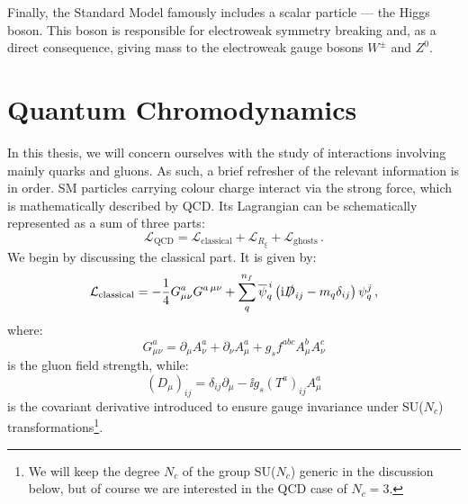 \documentclass[main.tex]{subfiles}
\begin{document}
Finally, the Standard Model famously includes a scalar particle --- the Higgs boson. This boson is responsible for electroweak symmetry breaking and, as a direct consequence, giving mass to the electroweak gauge bosons $W^\pm$ and $Z^0$. 
\section{Quantum Chromodynamics} \label{sec:QCD}
In this thesis, we will concern ourselves with the study of interactions involving mainly quarks and gluons. As such, a brief refresher of the relevant information is in order. SM particles carrying colour charge interact via the strong force, which is mathematically described by QCD. Its Lagrangian can be schematically represented as a sum of three parts:
\begin{equation}
    \mathcal{L}_{\text{QCD}} = \mathcal{L}_{\text{classical}} + \mathcal{L}_{R_\xi} + \mathcal{L}_{\text{ghosts}}\,.
\end{equation}
We begin by discussing the classical part. It is given by:
\begin{equation} \label{eq:QCDLagrangian}
    \mathcal{L}_{\text{classical}} = -\frac{1}{4} G^a_{\mu\nu} G^{a\,\mu\nu} + \sum_q^{n_f} \overline{\psi}_{q}^{\,i} \left(\mathrm{i} \slashed{D}_{ij} - m_q \delta_{ij} \right) \psi_q^j\,,
\end{equation}
where:
\begin{equation}
     G^a_{\mu\nu} = \partial_\mu A^a_\nu + \partial_\nu A^a_\mu + g_s f^{abc} A^b_\mu A^c_\nu
\end{equation}
is the gluon field strength, while:
\begin{equation}
    (D_\mu)_{ij} = \delta_{ij} \partial_\mu - \ii g_s (T^a)_{ij} A^a_\mu
\end{equation}
is the covariant derivative introduced to ensure gauge invariance under SU($N_c$) transformations\footnote{We will keep the degree $N_c$ of the group SU($N_c$) generic in the discussion below, but of course we are interested in the QCD case of $N_c=3$.}.
\end{document}
